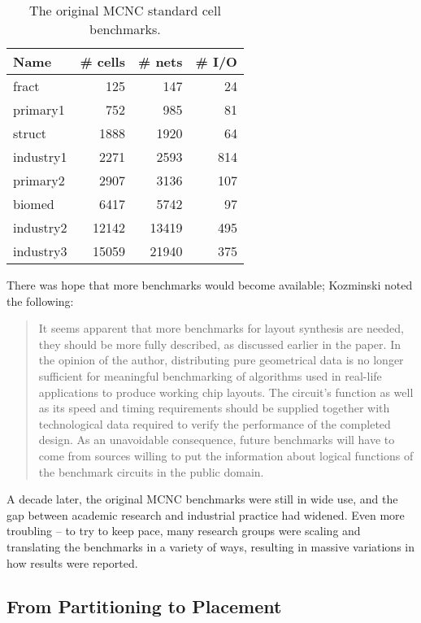 \documentclass[sigconf]{acmart}
\begin{document}
\begin{table}
  \begin{tabular}{|l|r|r|r|} \hline
Name & \# cells & \# nets & \# I/O \\ \hline
    fract   &   125 &   147 & 24 \\ \hline
   primary1 &   752 &   985 & 81 \\ \hline
    struct  &  1888 &  1920 & 64 \\ \hline
  industry1 &  2271 & 2593 & 814 \\ \hline
  primary2 & 2907 & 3136 & 107 \\ \hline
  biomed & 6417 & 5742 & 97 \\ \hline
  industry2 & 12142 & 13419 & 495 \\ \hline
  industry3 & 15059 & 21940 & 375 \\ \hline
  \end{tabular}
  \caption{The original MCNC standard cell
    benchmarks\cite{Kozminski91}.}\label{tab:mcnc}
\end{table}


There was hope that more benchmarks would
become available; Kozminski\cite{Kozminski91} noted the following:

\begin{quote}
It seems apparent that more benchmarks for layout synthesis are
needed, they should be more fully described, as discussed earlier in
the paper. In the opinion of the author, distributing pure
geometrical data is no longer sufficient for meaningful benchmarking
of algorithms used in real-life applications to produce working chip
layouts. The circuit's function as well as its speed and timing
requirements should be supplied together with technological data
required to verify the performance of the completed design. As an
unavoidable consequence, future benchmarks will have to come from
sources willing to put the information about logical functions of the
benchmark circuits in the public domain.
\end{quote}

A decade later, the original MCNC
benchmarks were still in wide use, and
the gap between academic research and
industrial practice had widened.
Even more troubling -- to try to keep pace, many research
groups were scaling and translating the benchmarks in
a variety of ways, resulting in massive variations in how
results were reported\cite{Madden010030}.

\subsection{From Partitioning to Placement}
\end{document}
